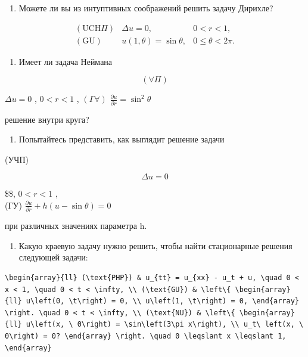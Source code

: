 \documentclass[
  ukrainian,
]{article}
\providecommand{\tightlist}{%
  \setlength{\itemsep}{0pt}\setlength{\parskip}{0pt}}
\begin{document}
\begin{enumerate}
\def\labelenumi{\arabic{enumi}.}
\tightlist
\item
  Можете ли вы из интуптивных соображений решить задачу Дирихле?
\end{enumerate}

\[
\begin{array}{ll} (\text{UCH}\Pi) & \Delta u = 0, & 0 < r < 1, \\ (\text{GU}) & u(1, \theta) = \sin \theta, & 0 \leqslant \theta < 2\pi. \end{array}
\]

\begin{enumerate}
\def\labelenumi{\arabic{enumi}.}
\setcounter{enumi}{1}
\tightlist
\item
  Имеет ли задача Неймана
\end{enumerate}

\[
(\forall \Pi)
\]

\(\Delta u = 0\) , \(0 < r < 1\) , \((\Gamma \forall)\)
\(\frac{\partial u}{\partial r} = \sin^2 \theta\)

решение внутри круга?

\begin{enumerate}
\def\labelenumi{\arabic{enumi}.}
\setcounter{enumi}{2}
\tightlist
\item
  Попытайтесь представить, как выглядит решение задачи
\end{enumerate}

(УЧП)

\[
\Delta u = 0
\]

\$\$, \(0 < r < 1\) ,\\
(ГУ) \(\frac{\partial u}{\partial r} + h(u - \sin \theta) = 0\)

при различных значениях параметра h.

\begin{enumerate}
\def\labelenumi{\arabic{enumi}.}
\setcounter{enumi}{3}
\tightlist
\item
  Какую краевую задачу нужно решить, чтобы найти стационарные решения
  следующей задачи:
\end{enumerate}

\begin{verbatim}
\begin{array}{ll} (\text{PHP}) & u_{tt} = u_{xx} - u_t + u, \quad 0 < x < 1, \quad 0 < t < \infty, \\ (\text{GU}) & \left\{ \begin{array}{ll} u\left(0, \t\right) = 0, \\ u\left(1, \t\right) = 0, \end{array} \right. \quad 0 < t < \infty, \\ (\text{NU}) & \left\{ \begin{array}{ll} u\left(x, \ 0\right) = \sin\left(3\pi x\right), \\ u_t\ left(x, \ 0\right) = 0? \end{array} \right. \quad 0 \leqslant x \leqslant 1, \end{array}
\end{verbatim}
\end{document}
